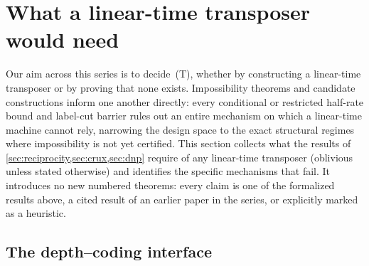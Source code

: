 \section{What a linear-time transposer would need}\label{sec:construction}

Our aim across this series is to decide~(T), whether by constructing a linear-time transposer or by proving that none
exists. Impossibility theorems and candidate constructions inform one another directly: every conditional or restricted
half-rate bound and label-cut barrier rules out an entire mechanism on which a linear-time machine cannot rely, narrowing
the design space to the exact structural regimes where impossibility is not yet certified. This section collects what the
results of \cref{sec:reciprocity,sec:crux,sec:dnp} require of any linear-time transposer (oblivious unless stated
otherwise) and identifies the specific mechanisms that fail. It introduces no new numbered theorems: every claim is one of
the formalized results above, a cited result of an earlier paper in the series, or explicitly marked as a heuristic.

\subsection{The depth--coding interface}\label{sec:con-interface}

